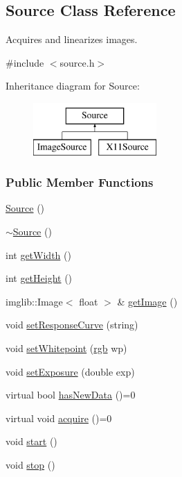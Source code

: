 \hypertarget{classSource}{\subsection{\-Source \-Class \-Reference}
\label{classSource}
}


\-Acquires and linearizes images.  




{\ttfamily \#include $<$source.\-h$>$}

\-Inheritance diagram for \-Source\-:\begin{figure}[H]
\begin{center}
\leavevmode
\includegraphics[height=2.000000cm]{classSource}
\end{center}
\end{figure}
\subsubsection*{\-Public \-Member \-Functions}
\begin{DoxyCompactItemize}
\item 
\hyperlink{classSource_a660c0a4b8b8f8402568bef86f2cb2fbb}{\-Source} ()
\item 
\hyperlink{classSource_ac5104a4d66641ae529419b47da4a1473}{$\sim$\-Source} ()
\item 
int \hyperlink{classSource_a57fa5355c01ffdd49d48331b5f304535}{get\-Width} ()
\item 
int \hyperlink{classSource_a1a3e7f05482421bb452f4a6e279a3a19}{get\-Height} ()
\item 
imglib\-::\-Image$<$ float $>$ \& \hyperlink{classSource_aae57269d415b165dfdb91266fc6846ff}{get\-Image} ()
\item 
void \hyperlink{classSource_ac14305006174296199fcbb4fb7e864f8}{set\-Response\-Curve} (string)
\item 
void \hyperlink{classSource_a9a58eb483f03b8778e2058cb4657c3c1}{set\-Whitepoint} (\hyperlink{structrgb}{rgb} wp)
\item 
void \hyperlink{classSource_ac6b164894dc462ea9e5eeb7a96fb62d3}{set\-Exposure} (double exp)
\item 
virtual bool \hyperlink{classSource_acc6f90436f56986b5d261c2408bc1196}{has\-New\-Data} ()=0
\item 
virtual void \hyperlink{classSource_a22e791e3c667fe6d65fa79b30ddc44da}{acquire} ()=0
\item 
void \hyperlink{classSource_ab6174d1cf0bf11ec04a3ff24f75b4f81}{start} ()
\item 
void \hyperlink{classSource_af6025573f44c8fb0485571642a8a0db3}{stop} ()
\end{DoxyCompactItemize}
